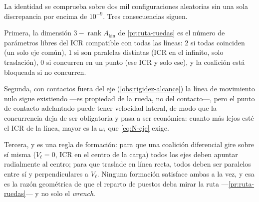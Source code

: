 \begin{observacion}
\label{obs:icr-comun}
La identidad se comprueba sobre dos mil configuraciones aleatorias sin una sola
discrepancia por encima de $10^{-9}$. Tres consecuencias siguen.

Primera, la dimensión $3-\operatorname{rank}A_{\mathrm{kin}}$ de
\cref{pr:ruta-ruedas} es el número de parámetros libres del ICR compatible con
todas las líneas: $2$ si todas coinciden (un solo eje común), $1$ si son
paralelas distintas (ICR en el infinito, solo traslación), $0$ si concurren en
un punto (ese ICR y solo ese), y la coalición está bloqueada si no concurren.

Segunda, con contactos fuera del eje (\cref{obs:rigidez-alcance}) la línea de
movimiento nulo sigue existiendo —es propiedad de la rueda, no del contacto—,
pero el punto de contacto adelantado puede tener velocidad lateral, de modo que
la concurrencia deja de ser obligatoria y pasa a ser económica: cuanto más lejos
esté el ICR de la línea, mayor es la $\omega_i$ que \eqref{eq:N-eje} exige.

Tercera, y es una regla de formación: para que una coalición diferencial gire
sobre sí misma ($V_\ell=0$, ICR en el centro de la carga) todos los ejes deben
apuntar radialmente al centro; para que traslade en línea recta, todos deben ser
paralelos entre sí y perpendiculares a $V_\ell$. Ninguna formación satisface
ambas a la vez, y esa es la razón geométrica de que el reparto de puestos deba
mirar la ruta —\cref{pr:ruta-ruedas}— y no solo el \emph{wrench}.
\end{observacion}
